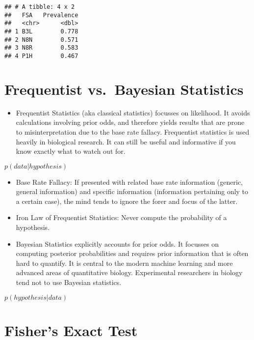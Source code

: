 \documentclass[]{article}
\providecommand{\tightlist}{%
  \setlength{\itemsep}{0pt}\setlength{\parskip}{0pt}}
\begin{document}
\begin{verbatim}
## # A tibble: 4 x 2
##   FSA   Prevalence
##   <chr>      <dbl>
## 1 B3L        0.778
## 2 N8N        0.571
## 3 N8R        0.583
## 4 P1H        0.467
\end{verbatim}

\hypertarget{frequentist-vs.bayesian-statistics}{%
\section{Frequentist vs.~Bayesian
Statistics}\label{frequentist-vs.bayesian-statistics}}

\begin{itemize}
\tightlist
\item
  Frequentist Statistics (aka classical statistics) focusses on
  likelihood. It avoids calculations involving prior odds, and therefore
  yields results that are prone to misinterpretation due to the base
  rate fallacy. Frequentist statistics is used heavily in biological
  research. It can still be useful and informative if you know exactly
  what to watch out for.
\end{itemize}

\(p(data|hypothesis)\)

\begin{itemize}
\item
  Base Rate Fallacy: If presented with related base rate information
  (generic, general information) and specific information (information
  pertaining only to a certain case), the mind tends to ignore the forer
  and focus of the latter.
\item
  Iron Law of Frequentist Statistics: Never compute the probability of a
  hypothesis.
\item
  Bayesian Statistics explicitly accounts for prior odds. It focusses on
  computing posterior probabilities and requires prior information that
  is often hard to quantify. It is central to the modern machine
  learning and more advanced areas of quantitative biology. Experimental
  researchers in biology tend not to use Bayesian statistics.
\end{itemize}

\(p(hypothesis|data)\)

\hypertarget{fishers-exact-test}{%
\section{Fisher's Exact Test}\label{fishers-exact-test}}
\end{document}
